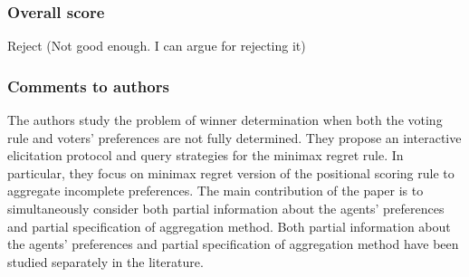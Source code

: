 \documentclass[version=3.21, pagesize, twoside=off, bibliography=totoc, DIV=calc, fontsize=12pt, a4paper]{scrartcl}
\begin{document}
\subsubsection*{Overall score}
Reject (Not good enough. I can argue for rejecting it)
\subsubsection*{Comments to authors}
The authors study the problem of winner determination when both the voting rule and voters' preferences are not fully determined. They propose an interactive elicitation protocol and query strategies for the minimax regret rule. In particular, they focus on minimax regret version of the positional scoring rule to aggregate incomplete preferences. The main contribution of the paper is to simultaneously consider both partial information about the agents’ preferences and partial
specification of aggregation method. Both partial information about the agents’ preferences and partial specification of aggregation method have been studied separately in the literature.
\end{document}
